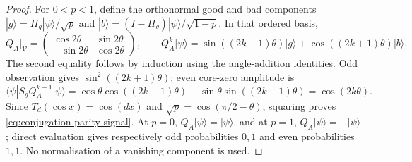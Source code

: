 \documentclass[11pt]{article}
\begin{document}
\begin{proof}
For $0<p<1$, define the orthonormal good and bad components
$|g\rangle=\Pi_g|\psi\rangle/\sqrt p$ and
$|b\rangle=(I-\Pi_g)|\psi\rangle/\sqrt{1-p}$. In that ordered basis,
\begin{equation}
 Q_A\big|_{\mathcal V}
 =\begin{pmatrix}\cos2\theta&\sin2\theta\\
                 -\sin2\theta&\cos2\theta\end{pmatrix},
 \qquad
 Q_A^k|\psi\rangle
 =\sin((2k+1)\theta)|g\rangle+
   \cos((2k+1)\theta)|b\rangle.
 \label{eq:conjugation-grover-matrix}
\end{equation}
The second equality follows by induction using the angle-addition
identities. Odd observation gives $\sin^2((2k+1)\theta)$; even
core-zero amplitude is
\begin{equation}
 \langle\psi|S_g Q_A^{k-1}|\psi\rangle
 =\cos\theta\cos((2k-1)\theta)
  -\sin\theta\sin((2k-1)\theta)
 =\cos(2k\theta).
 \label{eq:conjugation-even-amplitude}
\end{equation}
Since $T_d(\cos x)=\cos(dx)$ and
$\sqrt p=\cos(\pi/2-\theta)$, squaring proves
\eqref{eq:conjugation-parity-signal}. At $p=0$, $Q_A|\psi\rangle
=|\psi\rangle$, and at $p=1$, $Q_A|\psi\rangle=-|\psi\rangle$;
direct evaluation gives respectively odd probabilities $0,1$ and
even probabilities $1,1$. No normalisation of a vanishing component
is used.


\end{proof}
\end{document}
